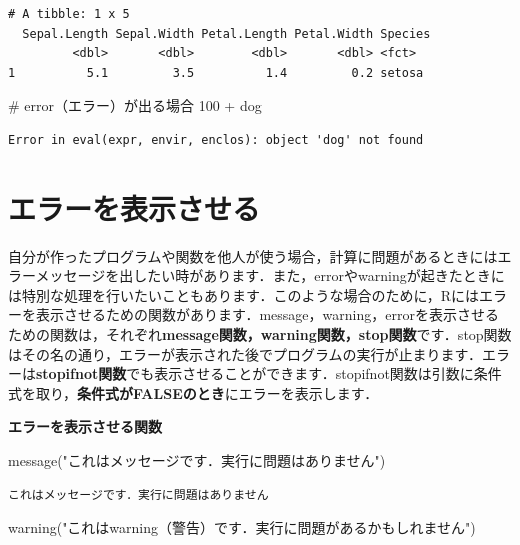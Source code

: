 \documentclass[
  letterpaper,
  DIV=11,
  numbers=noendperiod]{scrreprt}
\newenvironment{Shaded}{\begin{snugshade}}{\end{snugshade}}
\newcommand{\CommentTok}[1]{\textcolor[rgb]{0.37,0.37,0.37}{#1}}
\newcommand{\DecValTok}[1]{\textcolor[rgb]{0.68,0.00,0.00}{#1}}
\newcommand{\FunctionTok}[1]{\textcolor[rgb]{0.28,0.35,0.67}{#1}}
\newcommand{\NormalTok}[1]{\textcolor[rgb]{0.00,0.23,0.31}{#1}}
\newcommand{\SpecialCharTok}[1]{\textcolor[rgb]{0.37,0.37,0.37}{#1}}
\newcommand{\StringTok}[1]{\textcolor[rgb]{0.13,0.47,0.30}{#1}}
\begin{document}
\begin{verbatim}
# A tibble: 1 x 5
  Sepal.Length Sepal.Width Petal.Length Petal.Width Species
         <dbl>       <dbl>        <dbl>       <dbl> <fct>  
1          5.1         3.5          1.4         0.2 setosa 
\end{verbatim}

\begin{Shaded}
\begin{Highlighting}[]
\CommentTok{\# error（エラー）が出る場合}
\DecValTok{100} \SpecialCharTok{+}\NormalTok{ dog}
\end{Highlighting}
\end{Shaded}

\begin{verbatim}
Error in eval(expr, envir, enclos): object 'dog' not found
\end{verbatim}

\hypertarget{ux30a8ux30e9ux30fcux3092ux8868ux793aux3055ux305bux308b}{%
\section{エラーを表示させる}\label{ux30a8ux30e9ux30fcux3092ux8868ux793aux3055ux305bux308b}}

自分が作ったプログラムや関数を他人が使う場合，計算に問題があるときにはエラーメッセージを出したい時があります．また，errorやwarningが起きたときには特別な処理を行いたいこともあります．このような場合のために，Rにはエラーを表示させるための関数があります．message，warning，errorを表示させるための関数は，それぞれ\textbf{message関数，warning関数，stop関数}です．stop関数はその名の通り，エラーが表示された後でプログラムの実行が止まります．エラーは\textbf{stopifnot関数}でも表示させることができます．stopifnot関数は引数に条件式を取り，\textbf{条件式がFALSEのとき}にエラーを表示します．

\textbf{エラーを表示させる関数}

\begin{Shaded}
\begin{Highlighting}[]
\FunctionTok{message}\NormalTok{(}\StringTok{"これはメッセージです．実行に問題はありません"}\NormalTok{)}
\end{Highlighting}
\end{Shaded}

\begin{verbatim}
これはメッセージです．実行に問題はありません
\end{verbatim}

\begin{Shaded}
\begin{Highlighting}[]
\FunctionTok{warning}\NormalTok{(}\StringTok{"これはwarning（警告）です．実行に問題があるかもしれません"}\NormalTok{)}
\end{Highlighting}
\end{Shaded}
\end{document}
